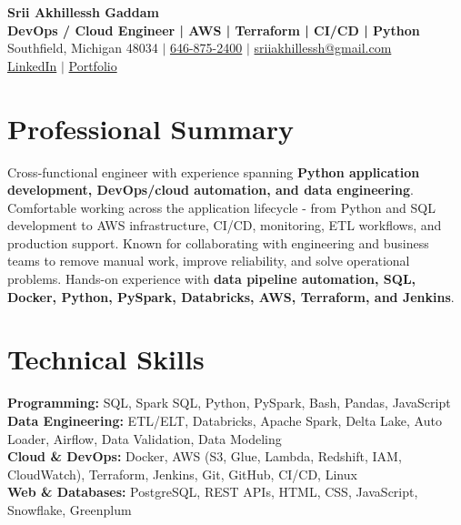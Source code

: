 \documentclass[letterpaper,10pt]{article}
\begin{document}
\fontsize{9.35pt}{10.45pt}\selectfont

\begin{center}
    {\LARGE \textbf{Srii Akhillessh Gaddam}} \\[-1pt]
    \textbf{DevOps / Cloud Engineer | AWS | Terraform | CI/CD | Python} \\[2pt]
    Southfield, Michigan 48034 $|$
    \href{tel:6468752400}{646-875-2400} $|$
    \href{mailto:sriiakhillessh@gmail.com}{sriiakhillessh@gmail.com} \\[1pt]
    \href{https://www.linkedin.com/in/srii-akhiilessh-gaddam-b48668191/}{LinkedIn} $|$
    \href{https://sriiakhillesshg.github.io/portfolio/}{Portfolio}
\end{center}
\vspace{-8pt}

\section{Professional Summary}
\small{Cross-functional engineer with experience spanning \textbf{Python application development, DevOps/cloud automation, and data engineering}. Comfortable working across the application lifecycle - from Python and SQL development to AWS infrastructure, CI/CD, monitoring, ETL workflows, and production support. Known for collaborating with engineering and business teams to remove manual work, improve reliability, and solve operational problems. Hands-on experience with \textbf{data pipeline automation, SQL, Docker, Python, PySpark, Databricks, AWS, Terraform, and Jenkins}.}

\section{Technical Skills}
\small{
\textbf{Programming:} SQL, Spark SQL, Python, PySpark, Bash, Pandas, JavaScript \\
\textbf{Data Engineering:} ETL/ELT, Databricks, Apache Spark, Delta Lake, Auto Loader, Airflow, Data Validation, Data Modeling \\
\textbf{Cloud \& DevOps:} Docker, AWS (S3, Glue, Lambda, Redshift, IAM, CloudWatch), Terraform, Jenkins, Git, GitHub, CI/CD, Linux \\
\textbf{Web \& Databases:} PostgreSQL, REST APIs, HTML, CSS, JavaScript, Snowflake, Greenplum
}
\end{document}
